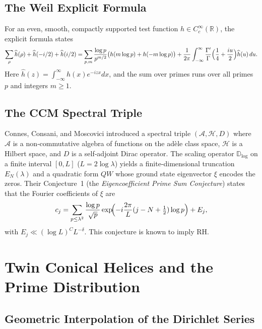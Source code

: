 \documentclass[12pt,a4paper,oneside]{book}
\newcommand{\R}{\mathbb{R}}
\begin{document}
\section{The Weil Explicit Formula}

For an even, smooth, compactly supported test function \(h\in C_c^\infty(\R)\), the explicit formula \cite{Weil} states
\[
\sum_{\rho} \widehat{h}(\rho) + \widehat{h}(-i/2) + \widehat{h}(i/2) = \sum_{p,m} \frac{\log p}{p^{m/2}} \bigl( h(m\log p) + h(-m\log p) \bigr) + \frac{1}{2\pi}\int_{-\infty}^{\infty} \frac{\Gamma'}{\Gamma}\Bigl(\frac14 + \frac{i u}{2}\Bigr) \widehat{h}(u)\,du .
\]
Here \(\widehat{h}(z)=\int_{-\infty}^{\infty} h(x)e^{-izx}dx\), and the sum over primes runs over all primes \(p\) and integers \(m\ge1\).

\section{The CCM Spectral Triple}

Connes, Consani, and Moscovici \cite{CCM} introduced a spectral triple \((\mathcal{A},\mathcal{H},D)\) where \(\mathcal{A}\) is a non‑commutative algebra of functions on the adèle class space, \(\mathcal{H}\) is a Hilbert space, and \(D\) is a self‑adjoint Dirac operator.  The scaling operator \(\mathbb{D}_{\log}\) on a finite interval \([0,L]\) (\(L=2\log\lambda\)) yields a finite‑dimensional truncation \(E_N(\lambda)\) and a quadratic form \(QW\) whose ground state eigenvector \(\xi\) encodes the zeros.  Their Conjecture~1 (the \emph{Eigencoefficient Prime Sum Conjecture}) states that the Fourier coefficients of \(\xi\) are
\[
c_j = \sum_{p\le\lambda^2} \frac{\log p}{\sqrt{p}} \exp\!\Bigl(-i\frac{2\pi}{L}(j-N+\tfrac12)\log p\Bigr) + E_j,
\]
with \(E_j\ll (\log L)^C L^{-\delta}\).  This conjecture is known to imply RH.

\chapter{Twin Conical Helices and the Prime Distribution}

\section{Geometric Interpolation of the Dirichlet Series}
\end{document}
